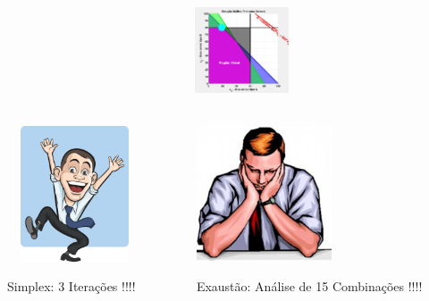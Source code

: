 \begin{frame}
{\begin{columns}
\begin{column}{0.5\textwidth}
		\end{column}
		\begin{column}{0.5\textwidth}
			\centering
			\includegraphics[width=2.8cm,height=2.8cm]{Exaustiva_6.jpeg}
		\end{column}
	\end{columns}
	}	
\end{frame}

\begin{frame}
	\begin{columns}
		\begin{column}{0.5\textwidth}
			\centering
			\includegraphics[width=4cm,height=4cm]{alegre.jpg}
			\begin{mdframed}[backgroundcolor=cyan!80]
				\centering
				Simplex: 3 Iterações !!!!
			\end{mdframed}
		\end{column}
		\begin{column}{0.5\textwidth}
			\centering
			\includegraphics[width=4cm,height=4cm]{triste.jpg}
			\begin{mdframed}[backgroundcolor=gray!60]
				\centering
				Exaustão: Análise de 15 Combinações !!!!
			\end{mdframed}
		\end{column}
	\end{columns}
\end{frame}
